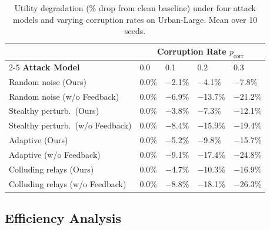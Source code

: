 \documentclass[final,3p,times,review,sort&compress]{elsarticle}
\begin{document}
\begin{table}[t]
\centering
\caption{Utility degradation (\% drop from clean baseline) under four attack models and varying corruption rates on Urban-Large. Mean over 10 seeds.}
\label{tab:stealthy}
\begin{tabularx}{\columnwidth}{lXXXX}
\toprule
& \multicolumn{4}{c}{\textbf{Corruption Rate $p_{\mathrm{corr}}$}} \\
\cmidrule(lr){2-5}
\textbf{Attack Model} & 0.0 & 0.1 & 0.2 & 0.3 \\
\midrule
Random noise (Ours) & 0.0\% & $-$2.1\% & $-$4.1\% & $-$7.8\% \\
Random noise (w/o Feedback) & 0.0\% & $-$6.9\% & $-$13.7\% & $-$21.2\% \\
\midrule
Stealthy perturb.\ (Ours) & 0.0\% & $-$3.8\% & $-$7.3\% & $-$12.1\% \\
Stealthy perturb.\ (w/o Feedback) & 0.0\% & $-$8.4\% & $-$15.9\% & $-$19.4\% \\
\midrule
Adaptive (Ours) & 0.0\% & $-$5.2\% & $-$9.8\% & $-$15.7\% \\
Adaptive (w/o Feedback) & 0.0\% & $-$9.1\% & $-$17.4\% & $-$24.8\% \\
\midrule
Colluding relays (Ours) & 0.0\% & $-$4.7\% & $-$10.3\% & $-$16.9\% \\
Colluding relays (w/o Feedback) & 0.0\% & $-$8.8\% & $-$18.1\% & $-$26.3\% \\
\bottomrule
\end{tabularx}
\end{table}

\subsection{Efficiency Analysis}
\label{subsec:efficiency}
\end{document}
